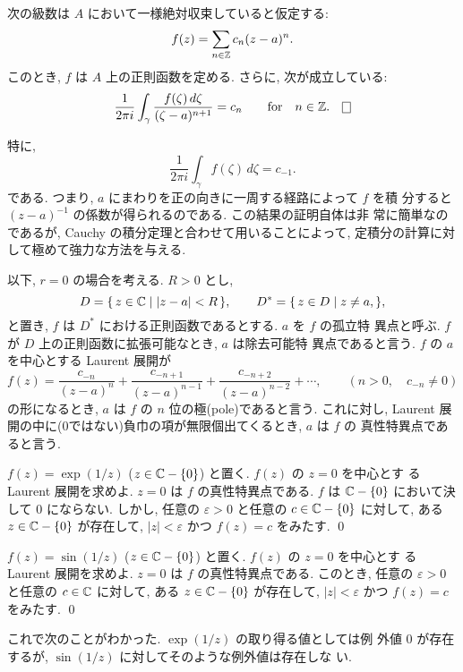 \documentclass[12pt,twoside]{jarticle}
\begin{document}
\begin{question}
  次の級数は $A$ において一様絶対収束していると仮定する:
  \[
    f(z) = \sum_{n\in{\mathbb Z}} c_n (z - a)^n.
  \]%
  このとき, $f$ は $A$ 上の正則函数を定める. さらに, 次が成立している:
  \[
    \frac{1}{2\pi i}
    \int_{\gamma} \frac{f(\zeta)\,d\zeta}{(\zeta - a)^{n+1}}
    = c_n
    \qquad
    \text{for}\quad n\in\Z.
    \qed
  \]%
\end{question}

\noindent 特に, 
\[
  \frac{1}{2\pi i} \int_{\gamma} f(\zeta)\,d\zeta = c_{-1}.
\]%
である. つまり, $a$ にまわりを正の向きに一周する経路によって $f$ を積
分すると $(z-a)^{-1}$ の係数が得られるのである. この結果の証明自体は非
常に簡単なのであるが, Cauchy の積分定理と合わせて用いることによって, 
定積分の計算に対して極めて強力な方法を与える.


以下, $r=0$ の場合を考える. $R > 0$ とし, 
\[%
  D = \{\, z\in\C \mid |z - a| < R \,\},
  \qquad
  D^* = \{\, z\in D \mid z \ne a,\},
\]%
と置き, $f$ は $D^*$ における正則函数であるとする. $a$ を $f$ の孤立特
異点と呼ぶ. $f$ が $D$ 上の正則函数に拡張可能なとき, $a$ は除去可能特
異点であると言う. $f$ の $a$ を中心とする Laurent 展開が
\[%
  f(z) =
  \frac{c_{-n}}{(z-a)^n}
  + \frac{c_{-n+1}}{(z-a)^{n-1}}
  + \frac{c_{-n+2}}{(z-a)^{n-2}}
  + \cdots,
  \qquad
  (n > 0, \quad c_{-n}\ne 0)
\]%
の形になるとき, $a$ は $f$ の $n$ 位の極(pole)であると言う. これに対し,
Laurent 展開の中に(0ではない)負巾の項が無限個出てくるとき, $a$ は $f$ の
真性特異点であると言う.

\begin{question}
  $f(z)=\exp(1/z)$ ($z\in{\mathbb C}-\{0\}$) と置く. $f(z)$ の $z=0$ を中心とす
  る Laurent 展開を求めよ. $z=0$ は $f$ の真性特異点である. $f$ は 
  ${\mathbb C}-\{0\}$ において決して $0$ にならない. しかし, 任意の %
  $\varepsilon>0$ と任意の $c\in{\mathbb C}-\{0\}$ に対して, ある 
  $z\in{\mathbb C}-\{0\}$ が存在して, $|z|<\varepsilon$ かつ $f(z)=c$ をみたす.
  \qed
\end{question}

\begin{question}
  $f(z)=\sin(1/z)$ ($z\in{\mathbb C}-\{0\}$) と置く. $f(z)$ の $z=0$ を中心とす
  る Laurent 展開を求めよ. $z=0$ は $f$ の真性特異点である. このとき, 
  任意の $\varepsilon>0$ と任意の $c\in{\mathbb C}$ に対して, ある 
  $z\in{\mathbb C}-\{0\}$ が存在して, $|z|<\varepsilon$ かつ $f(z)=c$ をみたす.
  \qed
\end{question}

\noindent これで次のことがわかった. $\exp(1/z)$ の取り得る値としては例
外値 $0$ が存在するが, $\sin(1/z)$ に対してそのような例外値は存在しな
い.
\end{document}
